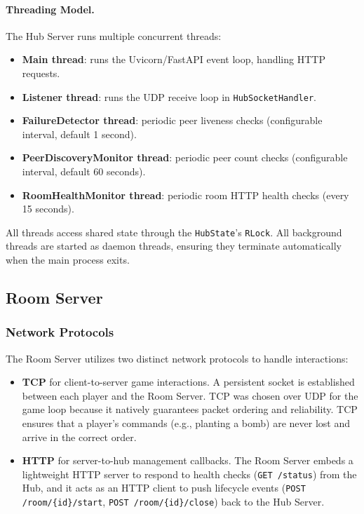 \paragraph{Threading Model.}
The Hub Server runs multiple concurrent threads:
\begin{itemize}
  \item \textbf{Main thread}: runs the Uvicorn/FastAPI event loop, handling HTTP requests.
  \item \textbf{Listener thread}: runs the UDP receive loop in \texttt{HubSocketHandler}.
  \item \textbf{FailureDetector thread}: periodic peer liveness checks (configurable interval, default 1 second).
  \item \textbf{PeerDiscoveryMonitor thread}: periodic peer count checks (configurable interval, default 60 seconds).
  \item \textbf{RoomHealthMonitor thread}: periodic room HTTP health checks (every 15 seconds).
\end{itemize}

All threads access shared state through the \texttt{HubState}'s \texttt{RLock}. All background threads are started as daemon threads, ensuring they terminate automatically when the main process exits.

\subsection{Room Server}\label{implementation-room}

\subsubsection{Network Protocols}

The Room Server utilizes two distinct network protocols to handle interactions:

\begin{itemize}
    \item \textbf{TCP} for client-to-server game interactions. 
    A persistent socket is established between each player and the Room Server. 
    TCP was chosen over UDP for the game loop because it natively guarantees packet ordering and reliability. 
    TCP ensures that a player's commands (e.g., planting a bomb) are never lost and arrive in the correct order.
    
    \item \textbf{HTTP} for server-to-hub management callbacks. 
    The Room Server embeds a lightweight HTTP server to respond to health checks (\texttt{GET /status}) from the Hub, and it acts as an HTTP client to push lifecycle events (\texttt{POST /room/\{id\}/start}, \texttt{POST /room/\{id\}/close}) back to the Hub Server.
\end{itemize}

